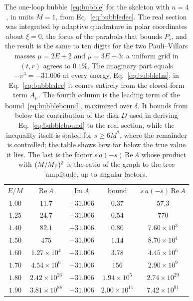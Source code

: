 \documentclass[aps,prd,10pt,twocolumn,superscriptaddress,nofootinbib,floatfix,longbibliography]{revtex4-2}
\begin{document}
\begin{table}[t]
\caption{The one-loop bubble~\eqref{eq:bubble} for the skeleton with $n=4$, in units $M=1$, from Eq.~\eqref{eq:bubbledec}. The real section was integrated by adaptive quadrature in polar coordinates about $\xi=0$, the focus of the parabola that bounds $P_s$, and the result is the same to ten digits for the two Pauli--Villars masses $\mu=2E+2$ and $\mu=3E+3$; a uniform grid in $(t,r)$ agrees to $0.1\%$. The imaginary part equals $-\pi^3=-31.006$ at every energy, Eq.~\eqref{eq:bubbleIm}; in Eq.~\eqref{eq:bubbledec} it comes entirely from the closed-form term $A_\mu$. The fourth column is the leading term of the bound~\eqref{eq:bubblebound}, maximized over $\delta$. It bounds from below the contribution of the disk $D$ used in deriving Eq.~\eqref{eq:bubblebound} to the real section, while the inequality itself is stated for $s\ge6M^2$, where the remainder is controlled; the table shows how far below the true value it lies. The last is the factor $s\,a(-s)\,\mathrm{Re}\,A$ whose product with $(M/M_{\rm P})^2$ is the ratio of the graph to the tree amplitude, up to angular factors.}
\label{tab:bubble}
\begin{ruledtabular}
\begin{tabular}{ccccc}
$E/M$ & $\mathrm{Re}\,A$ & $\mathrm{Im}\,A$ & bound & $s\,a(-s)\,\mathrm{Re}\,A$\\
\colrule
$1.00$ & $11.7$ & $-31.006$ & $0.37$ & $57.3$\\
$1.25$ & $24.7$ & $-31.006$ & $0.54$ & $770$\\
$1.40$ & $82.1$ & $-31.006$ & $0.80$ & $7.60\times10^{3}$\\
$1.50$ & $475$ & $-31.006$ & $1.14$ & $8.70\times10^{4}$\\
$1.60$ & $1.27\times10^{4}$ & $-31.006$ & $3.78$ & $4.45\times10^{6}$\\
$1.70$ & $4.54\times10^{6}$ & $-31.006$ & $156$ & $2.90\times10^{9}$\\
$1.80$ & $2.42\times10^{26}$ & $-31.006$ & $1.94\times10^{5}$ & $2.74\times10^{29}$\\
$1.90$ & $3.81\times10^{88}$ & $-31.006$ & $2.00\times10^{11}$ & $7.42\times10^{91}$\\
\end{tabular}
\end{ruledtabular}
\end{table}
\end{document}
